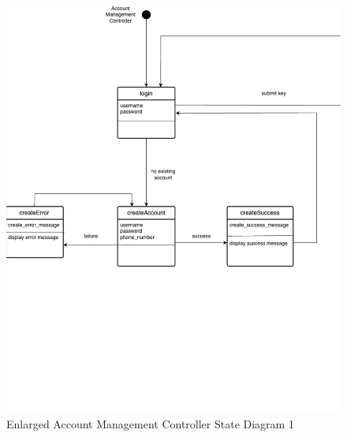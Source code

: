 \documentclass[]{article}
\begin{document}
\renewcommand{\thefigure}{2.2.\arabic{figure}}
\setcounter{figure}{0}
\begin{figure}[H]
	\centering
	\includegraphics[scale=0.75]{account-1.png}
	\caption{Enlarged Account Management Controller State Diagram 1}
	\label{fig:authentication-controller}
\end{figure}
\end{document}
